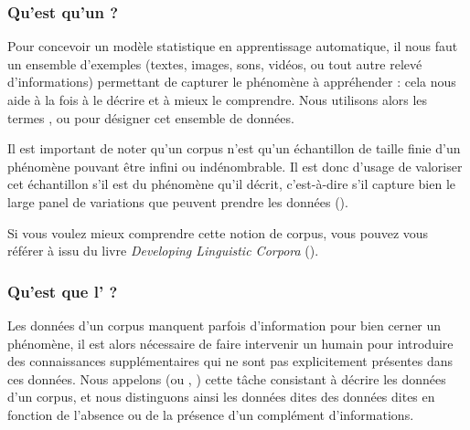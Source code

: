 		\subsubsection{Qu'est qu'un \textguillemets{\texttt{corpus d’entraînement}} ?}
		\label{section:2.1.1.B-PRESENTATION-ANNOTATION-DEFINITION-BASE-APPRENTISSAGE}

			Pour concevoir un modèle statistique en apprentissage automatique, il nous faut un ensemble d'exemples (textes, images, sons, vidéos, ou tout autre relevé d'informations) permettant de capturer le phénomène à appréhender : cela nous aide à la fois à le décrire et à mieux le comprendre.
			Nous utilisons alors les termes ,  ou  pour désigner cet ensemble de données.
			
			Il est important de noter qu'un corpus n'est qu'un échantillon de taille finie d'un phénomène pouvant être infini ou indénombrable.
			Il est donc d'usage de valoriser cet échantillon s'il est  du phénomène qu'il décrit, c'est-à-dire s'il capture bien le large panel de variations que peuvent prendre les données (\cite{biber:1993:representativeness-corpus-design}).
			
			\begin{leftBarInformation}
				Si vous voulez mieux comprendre cette notion de corpus, vous pouvez vous référer à \cite{sinclair:2004:corpus-text-basic} issu du livre \textit{Developing Linguistic Corpora} (\cite{wynne:2004:developing-linguistic-corpora}).
			\end{leftBarInformation}
		
		\subsubsection{Qu'est que l' ?}
		\label{section:2.1.1.C-PRESENTATION-ANNOTATION-DEFINITION-ANNOTATION}
			
			Les données d'un corpus manquent parfois d'information pour bien cerner un phénomène, il est alors nécessaire de faire intervenir un humain pour introduire des connaissances supplémentaires qui ne sont pas explicitement présentes dans ces données.
			Nous appelons  (ou , ) cette tâche consistant à décrire les données d'un corpus, et nous distinguons ainsi les données dites  des données dites  en fonction de l'absence ou de la présence d'un complément d'informations.
			
